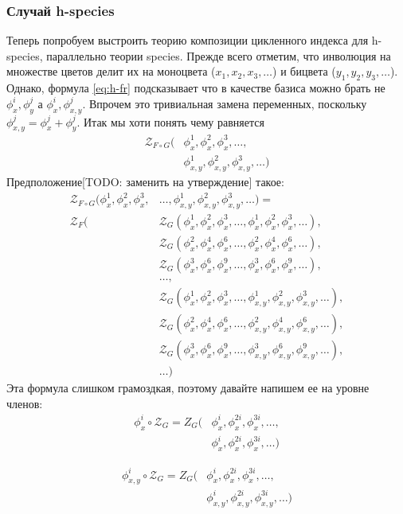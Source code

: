 \subsubsection{Случай h-species}
Теперь попробуем выстроить теорию композиции цикленного индекса для h-species,
параллельно теории species. Прежде всего отметим, что инволюция на множестве
цветов делит их на моноцвета ($x_1, x_2, x_3, \dots$) и бицвета ($y_1, y_2,
y_3, \dots$). Однако, формула \ref{eq:h-fr} подсказывает что в качестве базиса
можно брать не $\phi_x^i, \phi_y^j$ а $\phi_x^i, \phi_{x,y}^j$. Впрочем это
тривиальная замена переменных, поскольку $\phi_{x,y}^j = \phi_x^j + \phi_y^j$.
Итак мы хоти понять чему равняется
\begin{equation*}
\begin{split}
\mathcal Z_{F \circ G} (&\phi_x^1, \phi_x^2, \phi_x^3, \dots, \\
						&\phi_{x,y}^1, \phi_{x,y}^2, \phi_{x,y}^3, \dots)
\end{split}
\end{equation*}
Предположение[TODO: заменить на утверждение] такое:
\begin{equation}
\begin{split}
\label{eq:h-zfg}
	\mathcal Z_{F \circ G} (\phi_x^1, \phi_x^2, \phi_x^3, &\dots, 
	\phi_{x,y}^1, \phi_{x,y}^2, \phi_{x,y}^3, \dots) = \\
	\mathcal Z_F(
		&\mathcal Z_G(\phi_x^1, \phi_x^2, \phi_x^3, \dots, 
					 \phi_x^1, \phi_x^2, \phi_x^3, \dots), \\
		&\mathcal Z_G(\phi_x^2, \phi_x^4, \phi_x^6, \dots, 
					 \phi_x^2, \phi_x^4, \phi_x^6, \dots), \\
		&\mathcal Z_G(\phi_x^3, \phi_x^6, \phi_x^9, \dots, 
					 \phi_x^3, \phi_x^6, \phi_x^9, \dots), \\
		&\dots, \\
		&\mathcal Z_G(\phi_x^1, \phi_x^2, \phi_x^3, \dots, 
					 \phi_{x,y}^1, \phi_{x,y}^2, \phi_{x,y}^3, \dots), \\
		&\mathcal Z_G(\phi_x^2, \phi_x^4, \phi_x^6, \dots, 
					 \phi_{x,y}^2, \phi_{x,y}^4, \phi_{x,y}^6, \dots), \\
		&\mathcal Z_G(\phi_x^3, \phi_x^6, \phi_x^9, \dots, 
					 \phi_{x,y}^3, \phi_{x,y}^6, \phi_{x,y}^9, \dots), \\
		&\dots
	)
\end{split}	
\end{equation}
Эта формула слишком грамоздкая, поэтому давайте напишем ее на уровне членов:
\begin{equation*}
\begin{split}
\phi_x^i \circ \mathcal Z_G = Z_G(&\phi_x^i, \phi_x^{2i}, \phi_x^{3i}, \dots, \\ 
					 			  &\phi_x^i, \phi_x^{2i}, \phi_x^{3i}, \dots)
\end{split}
\end{equation*}

\begin{equation*}
\begin{split}
\phi_{x, y}^i \circ \mathcal Z_G = 
Z_G(&\phi_x^i, \phi_x^{2i}, \phi_x^{3i}, \dots,\\
	&\phi_{x,y}^i, \phi_{x,y}^{2i}, \phi_{x,y}^{3i}, \dots)
\end{split}
\end{equation*}